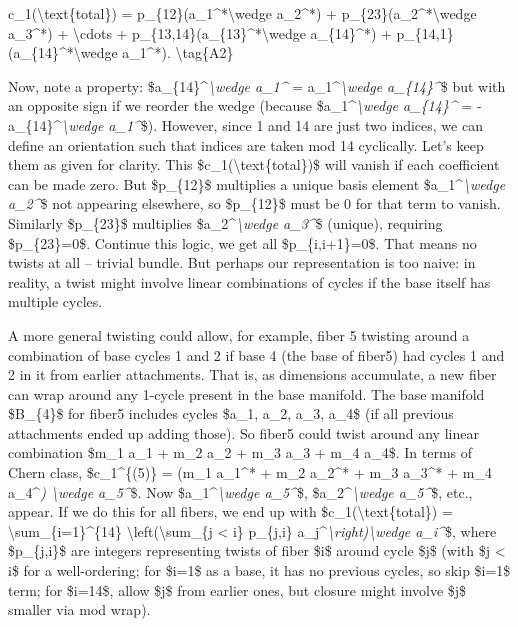\documentclass[]{article}
\begin{document}
c\_1(\textbackslash{}text\{total\}) =
p\_\{12\}(a\_1\^{}*\textbackslash{}wedge a\_2\^{}*) +
p\_\{23\}(a\_2\^{}*\textbackslash{}wedge a\_3\^{}*) +
\textbackslash{}cdots + p\_\{13,14\}(a\_\{13\}\^{}*\textbackslash{}wedge
a\_\{14\}\^{}*) + p\_\{14,1\}(a\_\{14\}\^{}*\textbackslash{}wedge
a\_1\^{}*). \textbackslash{}tag\{A2\}

Now, note a property: \$a\_\{14\}\^{}\emph{\textbackslash{}wedge
a\_1\^{}} = a\_1\^{}\emph{\textbackslash{}wedge a\_\{14\}\^{}}\$ but
with an opposite sign if we reorder the wedge (because
\$a\_1\^{}\emph{\textbackslash{}wedge a\_\{14\}\^{}} =
-a\_\{14\}\^{}\emph{\textbackslash{}wedge a\_1\^{}}\$). However, since 1
and 14 are just two indices, we can define an orientation such that
indices are taken mod 14 cyclically. Let's keep them as given for
clarity. This \$c\_1(\textbackslash{}text\{total\})\$ will vanish if
each coefficient can be made zero. But \$p\_\{12\}\$ multiplies a unique
basis element \$a\_1\^{}\emph{\textbackslash{}wedge a\_2\^{}}\$ not
appearing elsewhere, so \$p\_\{12\}\$ must be 0 for that term to vanish.
Similarly \$p\_\{23\}\$ multiplies \$a\_2\^{}\emph{\textbackslash{}wedge
a\_3\^{}}\$ (unique), requiring \$p\_\{23\}=0\$. Continue this logic, we
get all \$p\_\{i,i+1\}=0\$. That means no twists at all -- trivial
bundle. But perhaps our representation is too naive: in reality, a twist
might involve linear combinations of cycles if the base itself has
multiple cycles.

A more general twisting could allow, for example, fiber 5 twisting
around a combination of base cycles 1 and 2 if base 4 (the base of
fiber5) had cycles 1 and 2 in it from earlier attachments. That is, as
dimensions accumulate, a new fiber can wrap around any 1-cycle present
in the base manifold. The base manifold \$B\_\{4\}\$ for fiber5 includes
cycles \$a\_1, a\_2, a\_3, a\_4\$ (if all previous attachments ended up
adding those). So fiber5 could twist around any linear combination
\$m\_1 a\_1 + m\_2 a\_2 + m\_3 a\_3 + m\_4 a\_4\$. In terms of Chern
class, \$c\_1\^{}\{(5)\} = (m\_1 a\_1\^{}* + m\_2 a\_2\^{}* + m\_3
a\_3\^{}* + m\_4 a\_4\^{}\emph{) \textbackslash{}wedge a\_5\^{}}\$. Now
\$a\_1\^{}\emph{\textbackslash{}wedge a\_5\^{}}\$,
\$a\_2\^{}\emph{\textbackslash{}wedge a\_5\^{}}\$, etc., appear. If we
do this for all fibers, we end up with
\$c\_1(\textbackslash{}text\{total\}) =
\textbackslash{}sum\_\{i=1\}\^{}\{14\}
\textbackslash{}left(\textbackslash{}sum\_\{j \textless{} i\} p\_\{j,i\}
a\_j\^{}\emph{\textbackslash{}right)\textbackslash{}wedge a\_i\^{}}\$,
where \$p\_\{j,i\}\$ are integers representing twists of fiber \$i\$
around cycle \$j\$ (with \$j \textless{} i\$ for a well-ordering; for
\$i=1\$ as a base, it has no previous cycles, so skip \$i=1\$ term; for
\$i=14\$, allow \$j\$ from earlier ones, but closure might involve \$j\$
smaller via mod wrap).
\end{document}
